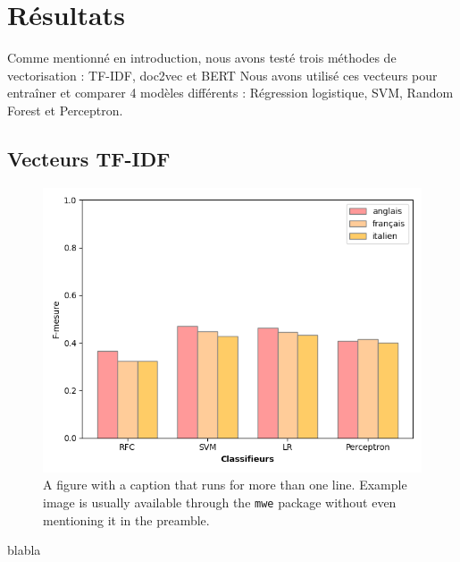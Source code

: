 \section{Résultats}

Comme mentionné en introduction, nous avons testé trois méthodes de vectorisation : TF-IDF, doc2vec et BERT
Nous avons utilisé ces vecteurs pour entraîner et comparer 4 modèles différents : Régression logistique, SVM, Random Forest et Perceptron.

\subsection{Vecteurs TF-IDF}

\begin{figure}[t]
  \includegraphics[width=\columnwidth]{assets/comparaison_metriques_tfidf.png}
  \caption{A figure with a caption that runs for more than one line.
    Example image is usually available through the \texttt{mwe} package
    without even mentioning it in the preamble.}
  \label{fig:tfidf_comparison}
\end{figure}

blabla